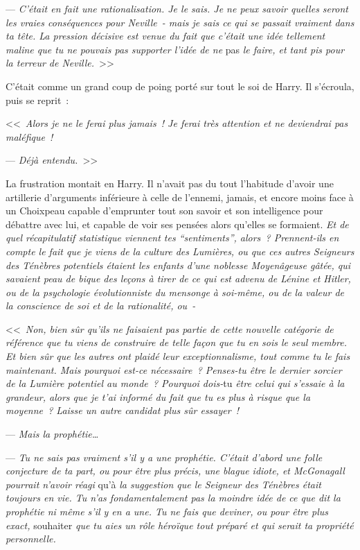 --- \emph{C'était en fait une rationalisation. Je le sais. Je ne peux savoir quelles seront les vraies conséquences pour Neville~- mais je sais ce qui se passait vraiment dans ta tête. La pression décisive est venue du fait que c'était une idée tellement maline que tu ne pouvais pas supporter l'idée de ne} pas \emph{le faire, et tant pis pour la terreur de Neville.}~>>

C'était comme un grand coup de poing porté sur tout le soi de Harry. Il s'écroula, puis se reprit~:

<<~\emph{Alors je ne le ferai plus jamais~! Je ferai très attention et ne deviendrai pas maléfique~!}

--- \emph{Déjà entendu.}~>>

La frustration montait en Harry. Il n'avait pas du tout l'habitude d'avoir une artillerie d'arguments inférieure à celle de l'ennemi, jamais, et encore moins face à un Choixpeau capable d'emprunter tout son savoir et son intelligence pour débattre avec lui, et capable de voir ses pensées alors qu'elles se formaient. \emph{Et de quel récapitulatif statistique viennent tes “sentiments”, alors~? Prennent-ils en compte le fait que je viens de la culture des Lumières, ou que ces autres Seigneurs des Ténèbres potentiels étaient les enfants d'une noblesse Moyenâgeuse gâtée, qui savaient peau de bique des leçons à tirer de ce qui est advenu de Lénine et Hitler, ou de la psychologie évolutionniste du mensonge à soi-même, ou de la valeur de la conscience de soi et de la rationalité, ou~-}

<<~\emph{Non, bien sûr qu'ils ne faisaient pas partie de cette nouvelle catégorie de référence que tu viens de construire de telle façon que tu en sois le seul membre. Et bien sûr que les autres ont plaidé leur exceptionnalisme, tout comme tu le fais maintenant. Mais pourquoi est-ce nécessaire~? Penses-tu être le dernier sorcier de la Lumière potentiel au monde~? Pourquoi dois-}tu \emph{être celui qui s'essaie à la grandeur, alors que je t'ai informé du fait que tu es plus à risque que la moyenne~? Laisse un autre candidat plus sûr essayer~!}

--- \emph{Mais la prophétie…}

--- \emph{Tu ne sais pas vraiment s'il y a une prophétie. C'était d'abord une folle conjecture de ta part, ou pour être plus précis, une blague idiote, et McGonagall pourrait n'avoir réagi} qu'à \emph{la suggestion que le Seigneur des Ténèbres était toujours en vie. Tu n'as fondamentalement pas la moindre idée de ce que dit la prophétie ni même s'il y en a une. Tu ne fais que deviner, ou pour être plus exact,} souhaiter \emph{que tu aies un rôle héroïque tout préparé et qui serait ta propriété personnelle.}


